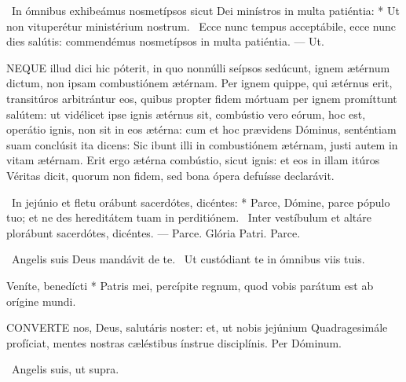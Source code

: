 \R\ In ómnibus exhibeámus nosmetípsos sicut Dei minístros in multa patiéntia: * Ut non vituperétur ministérium nostrum. \V\ Ecce nunc tempus acceptábile, ecce nunc dies salútis: commendémus nosmetípsos in multa patiéntia. --- Ut.


\lettrine[lines=2]{N}{EQUE} illud dici hic póterit, in quo nonnúlli seípsos sedúcunt, ignem ætérnum dictum, non ipsam combustiónem ætérnam. Per ignem quippe, qui ætérnus erit, transitúros arbitrántur eos, quibus propter fidem mórtuam per ignem promíttunt salútem: ut vidélicet ipse ignis ætérnus sit, combústio vero eórum, hoc est, operátio ignis, non sit in eos ætérna: cum et hoc prævidens Dóminus, senténtiam suam conclúsit ita dicens: Sic ibunt illi in combustiónem ætérnam, justi autem in vitam ætérnam. Erit ergo ætérna combústio, sicut ignis: et eos in illam itúros Véritas dicit, quorum non fidem, sed bona ópera defuísse declarávit.

\R\ In jejúnio et fletu orábunt sacerdótes, dicéntes: * Parce, Dómine, parce pópulo tuo; et ne des hereditátem tuam in perditiónem. \V\ Inter vestíbulum et altáre plorábunt sacerdótes, dicéntes. --- Parce. Glória Patri. Parce.




\V\ Angelis suis Deus mandávit de te. \R\ Ut custódiant te in ómnibus viis tuis.

 Veníte, benedícti * Patris mei, percípite regnum, quod vobis parátum est ab orígine mundi.


\lettrine[lines=2]{C}{ONVERTE} nos, Deus, salutáris noster: et, ut nobis jejúnium Quadragesimále profíciat, mentes nostras cæléstibus ínstrue disciplínis. Per Dóminum.


\V\ Angelis suis, ut supra.

